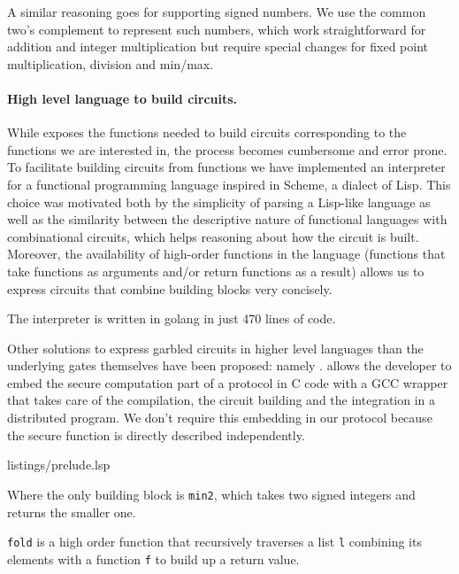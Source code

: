 A similar reasoning goes for supporting signed numbers.  We use the common
two's complement to represent such numbers, which work straightforward for
addition and integer multiplication but require special changes for fixed point
multiplication, division and min/max.

\paragraph{High level language to build circuits.}

While \libgarble{} exposes the functions needed to build circuits corresponding
to the functions we are interested in, the process becomes cumbersome and error
prone.  To facilitate building circuits from functions we have implemented an
interpreter for a functional programming language inspired in Scheme, a dialect
of Lisp.  This choice was motivated both by the simplicity of parsing a
Lisp-like language as well as the similarity between the descriptive nature of
functional languages with combinational circuits, which helps reasoning about
how the circuit is built.  Moreover, the availability of high-order functions
in the language (functions that take functions as arguments and/or return
functions as a result) allows us to express circuits that combine building
blocks very concisely.

The interpreter is written in golang in just 470 lines of code.

Other solutions to express garbled circuits in higher level languages than the
underlying gates themselves have been proposed: namely \OblivC{}.  \OblivC{}
allows the developer to embed the secure computation part of a protocol in C
code with a GCC wrapper that takes care of the compilation, the circuit
building and the integration in a distributed program.  We don't require this
embedding in our protocol because the secure function is directly described
independently.



{listings/prelude.lsp}

Where the only \libgarble{} building block is \texttt{min2}, which takes two
signed integers and returns the smaller one.

\texttt{fold} is a high order function that recursively traverses a list
\texttt{l} combining its elements with a function \texttt{f} to build up a
return value.

